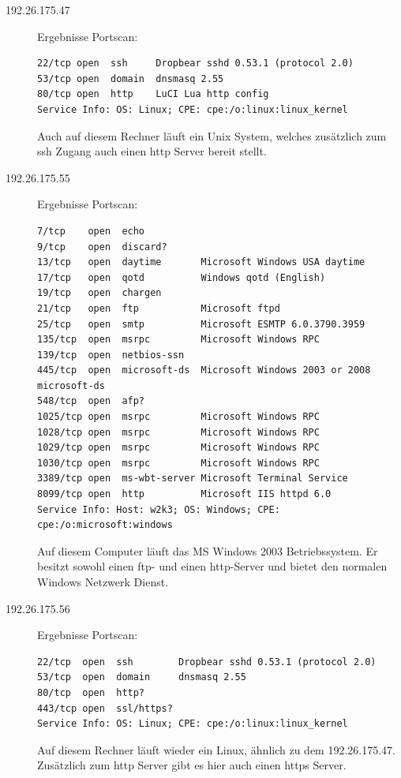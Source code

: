 \documentclass[10pt,a4paper]{article}
\begin{document}
\begin{description}
\item[192.26.175.47] Ergebnisse Portscan:
\begin{verbatim}
22/tcp open  ssh     Dropbear sshd 0.53.1 (protocol 2.0)
53/tcp open  domain  dnsmasq 2.55
80/tcp open  http    LuCI Lua http config
Service Info: OS: Linux; CPE: cpe:/o:linux:linux_kernel
\end{verbatim}
Auch auf diesem Rechner läuft ein Unix System, welches zusätzlich zum ssh Zugang auch einen http Server bereit stellt.


\item[192.26.175.55] Ergebnisse Portscan:
\begin{verbatim}
7/tcp    open  echo
9/tcp    open  discard?
13/tcp   open  daytime       Microsoft Windows USA daytime
17/tcp   open  qotd          Windows qotd (English)
19/tcp   open  chargen
21/tcp   open  ftp           Microsoft ftpd
25/tcp   open  smtp          Microsoft ESMTP 6.0.3790.3959
135/tcp  open  msrpc         Microsoft Windows RPC
139/tcp  open  netbios-ssn
445/tcp  open  microsoft-ds  Microsoft Windows 2003 or 2008 microsoft-ds
548/tcp  open  afp?
1025/tcp open  msrpc         Microsoft Windows RPC
1028/tcp open  msrpc         Microsoft Windows RPC
1029/tcp open  msrpc         Microsoft Windows RPC
1030/tcp open  msrpc         Microsoft Windows RPC
3389/tcp open  ms-wbt-server Microsoft Terminal Service
8099/tcp open  http          Microsoft IIS httpd 6.0
Service Info: Host: w2k3; OS: Windows; CPE: cpe:/o:microsoft:windows
\end{verbatim}
Auf diesem Computer läuft das MS Windows 2003 Betriebssystem. Er besitzt sowohl einen ftp- und einen http-Server und bietet den normalen Windows Netzwerk Dienst.

\item[192.26.175.56] Ergebnisse Portscan:
\begin{verbatim}
22/tcp  open  ssh        Dropbear sshd 0.53.1 (protocol 2.0)
53/tcp  open  domain     dnsmasq 2.55
80/tcp  open  http?
443/tcp open  ssl/https?
Service Info: OS: Linux; CPE: cpe:/o:linux:linux_kernel
\end{verbatim}
Auf diesem Rechner läuft wieder ein Linux, ähnlich zu dem 192.26.175.47. Zusätzlich zum http Server gibt es hier auch einen https Server.


\end{description}
\end{document}
